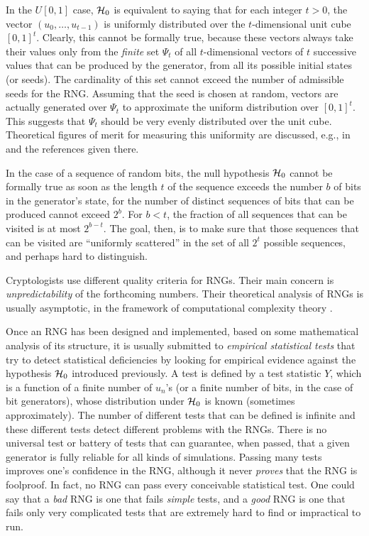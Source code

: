 In the $U[0,1]$ case, $\mathcal{H}_0$ is equivalent to saying that for each 
integer $t>0$, the vector $(u_{0},\dots,u_{t-1})$ is uniformly
distributed over the $t$-dimensional unit cube $[0,1]^t$.
Clearly, this cannot be formally true, because these vectors always 
take their values only from the {\em finite\/} set $\Psi_t$ of all
$t$-dimensional vectors of $t$ successive values that can be produced by
the generator, from all its possible initial states (or seeds).
The cardinality of this set cannot exceed the number of admissible
seeds for the RNG.  
Assuming that the seed is chosen at random,
vectors are actually generated over $\Psi_t$ 
to approximate the uniform distribution over $[0,1]^t$.
This suggests that $\Psi_t$ should be very evenly
distributed over the unit cube.
Theoretical figures of merit for measuring this uniformity are discussed,
e.g., in \cite{rLEC98h,rLEC99b,rLEC01a,rNIE92b,rTEZ95a} and the
references given there.

In the case of a sequence of random bits, the null hypothesis $\mathcal{H}_0$ 
cannot be formally true as soon as the length $t$ of the sequence exceeds
the number $b$ of bits in the generator's state, for the number of 
distinct sequences of bits that can be produced cannot exceed $2^b$.
For $b < t$, the fraction of all sequences that can be visited is at most
$2^{b-t}$.  The goal, then, is to make sure that those sequences
that can be visited are ``uniformly scattered'' in the set of all $2^t$
possible sequences, and perhaps hard to distinguish.

Cryptologists use different quality criteria for RNGs.
Their main concern is {\em unpredictability\/} of the forthcoming
numbers.  Their theoretical analysis of RNGs is usually asymptotic,
in the framework of computational complexity theory \cite{rKNU98a,rLAG93a}.

Once an RNG has been designed and implemented, 
based on some mathematical analysis of its structure, it is usually
submitted to {\em empirical statistical tests\/} that try to detect
statistical deficiencies by looking for empirical evidence against
the hypothesis $\mathcal{H}_0$ introduced previously.
A test is defined by a test statistic $Y$, which is a function of a
finite number of $u_n$'s 
(or a finite number of bits, in the case of bit generators), 
whose distribution under $\mathcal{H}_0$ is known (sometimes approximately).
The number of different tests that can be defined is infinite and
these different tests detect different problems with the RNGs.
There is no universal test or battery of tests that can guarantee,
when passed, that a given generator is fully reliable for all 
kinds of simulations.  Passing many tests improves one's
confidence in the RNG, although it never {\em proves\/} that 
the RNG is foolproof.
In fact, no RNG can pass every conceivable statistical test.
One could say that a {\em bad\/} RNG is one that fails
{\em simple\/} tests, and a {\em good\/} RNG is one that fails
only very complicated tests that are extremely hard to find 
or impractical to run.

